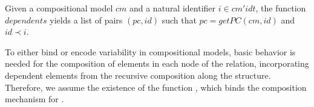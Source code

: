 
\begin{definition}
\label{defn:pair-dependents}
Given a compositional model $cm$ and a natural identifier $i \in \mathit{cm'idt}$, the function $\mathit{dependents}$ yields a list of pairs $\mathit{(pc,id)}$ such that $\mathit{pc = getPC(cm,id)}$ and $id \prec i$.
\end{definition}

To either bind or encode variability in compositional models, basic behavior is needed for the composition of elements in each node of the relation, incorporating dependent elements from the recursive composition along the structure. Therefore, we assume the existence of the function  , which binds the composition mechanism for . 

